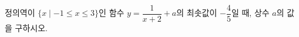 \hspace*{2mm}\begin{minipage}[t]{\dimexpr\linewidth-2mm\relax}\vspace{0pt}
정의역이 $\{x \mid -1\le x\le 3\}$인 함수 $y=\dfrac{1}{x+2}+a$의 최솟값이 $-\dfrac{4}{5}$일 때, 상수 $a$의 값을 구하시오.\end{minipage}
